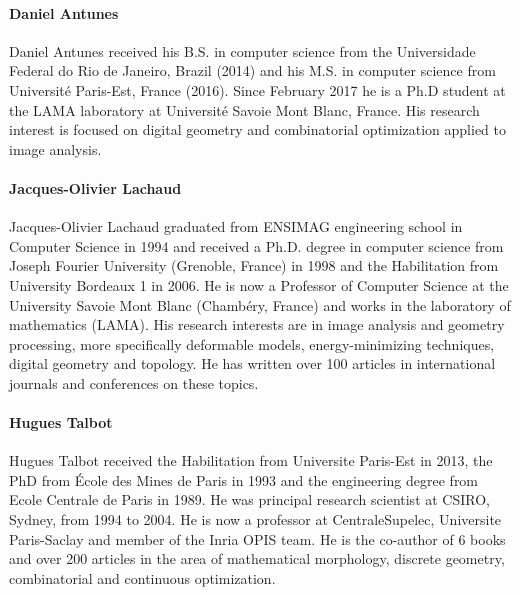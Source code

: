 

\paragraph{Daniel Antunes}
Daniel Antunes received his B.S. in computer science from the Universidade Federal do Rio de Janeiro, Brazil (2014) and his M.S. in  computer science from Université Paris-Est, France (2016). Since February 2017 he is a Ph.D student at the LAMA laboratory at Université Savoie Mont Blanc, France. His research interest is focused on digital geometry and combinatorial optimization applied to image analysis.


\paragraph{Jacques-Olivier Lachaud}
Jacques-Olivier Lachaud graduated from ENSIMAG engineering school in
Computer Science in 1994 and received a Ph.D. degree in computer
science from Joseph Fourier University (Grenoble, France) in 1998 and
the Habilitation from University Bordeaux 1 in 2006. He is now a
Professor of Computer Science at the University Savoie Mont Blanc
(Chambéry, France) and works in the laboratory of mathematics
(LAMA). His research interests are in image analysis and geometry
processing, more specifically deformable models, energy-minimizing
techniques, digital geometry and topology. He has written over 100
articles in international journals and conferences on these topics.

\paragraph{Hugues Talbot}
Hugues Talbot received the Habilitation from Universite Paris-Est in 2013, the PhD from \'Ecole des Mines de Paris in
1993 and the engineering degree from Ecole Centrale de Paris in 1989. He was principal research scientist at CSIRO,
Sydney, from 1994 to 2004. He is now a professor at CentraleSupelec, Universite Paris-Saclay and member of the Inria
OPIS team. He is the co-author of 6 books and over 200 articles in the area of mathematical morphology, discrete
geometry, combinatorial and continuous optimization.

